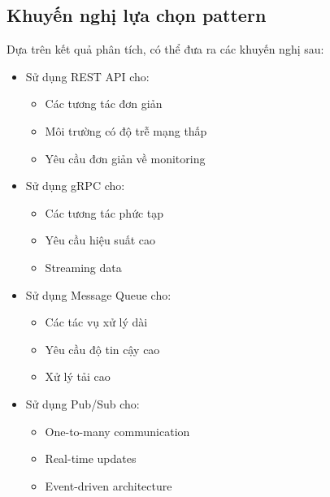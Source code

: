 \subsection{Khuyến nghị lựa chọn pattern}
Dựa trên kết quả phân tích, có thể đưa ra các khuyến nghị sau:
\begin{itemize}
    \item Sử dụng REST API cho:
    \begin{itemize}
        \item Các tương tác đơn giản
        \item Môi trường có độ trễ mạng thấp
        \item Yêu cầu đơn giản về monitoring
    \end{itemize}
    
    \item Sử dụng gRPC cho:
    \begin{itemize}
        \item Các tương tác phức tạp
        \item Yêu cầu hiệu suất cao
        \item Streaming data
    \end{itemize}
    
    \item Sử dụng Message Queue cho:
    \begin{itemize}
        \item Các tác vụ xử lý dài
        \item Yêu cầu độ tin cậy cao
        \item Xử lý tải cao
    \end{itemize}
    
    \item Sử dụng Pub/Sub cho:
    \begin{itemize}
        \item One-to-many communication
        \item Real-time updates
        \item Event-driven architecture
    \end{itemize}
\end{itemize} 